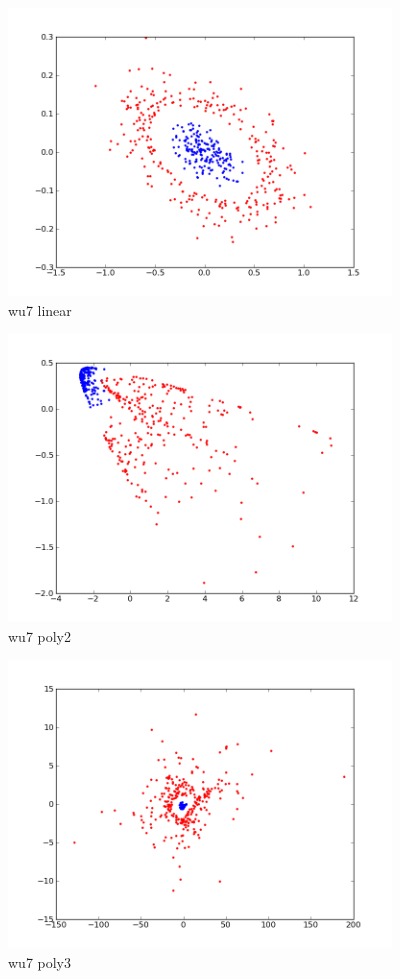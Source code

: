 \begin{figure}[here]
	\center
	\caption{wu7 linear}
	\label{fig:wu7_linear}
	\includegraphics[width=4.0in]{img/wu7_linear.png}
\end{figure}

\begin{figure}[here]
	\center
	\caption{wu7 poly2}
	\label{fig:wu7_poly2}
	\includegraphics[width=4.0in]{img/wu7_poly2.png}
\end{figure}

\begin{figure}[here]
	\center
	\caption{wu7 poly3}
	\label{fig:wu7_poly3}
	\includegraphics[width=4.0in]{img/wu7_poly3.png}
\end{figure}

